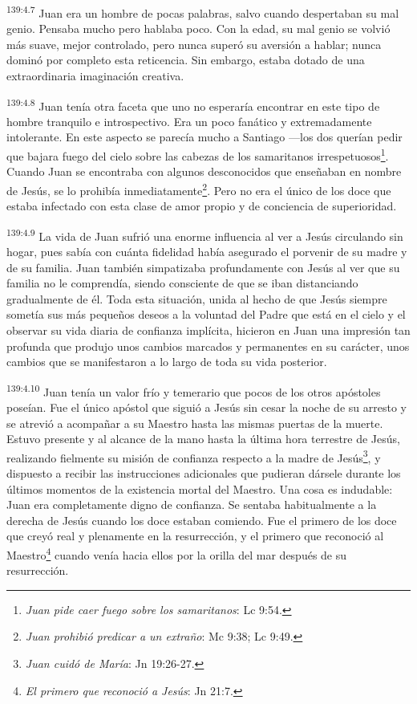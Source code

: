 \par
\textsuperscript{139:4.7} Juan era un hombre de pocas palabras, salvo cuando despertaban su mal genio. Pensaba mucho pero hablaba poco. Con la edad, su mal genio se volvió más suave, mejor controlado, pero nunca superó su aversión a hablar; nunca dominó por completo esta reticencia. Sin embargo, estaba dotado de una extraordinaria imaginación creativa.

\par
\textsuperscript{139:4.8} Juan tenía otra faceta que uno no esperaría encontrar en este tipo de hombre tranquilo e introspectivo. Era un poco fanático y extremadamente intolerante. En este aspecto se parecía mucho a Santiago ---los dos querían pedir que bajara fuego del cielo sobre las cabezas de los samaritanos irrespetuosos\footnote{\textit{Juan pide caer fuego sobre los samaritanos}: Lc 9:54.}. Cuando Juan se encontraba con algunos desconocidos que enseñaban en nombre de Jesús, se lo prohibía inmediatamente\footnote{\textit{Juan prohibió predicar a un extraño}: Mc 9:38; Lc 9:49.}. Pero no era el único de los doce que estaba infectado con esta clase de amor propio y de conciencia de superioridad.

\par
\textsuperscript{139:4.9} La vida de Juan sufrió una enorme influencia al ver a Jesús circulando sin hogar, pues sabía con cuánta fidelidad había asegurado el porvenir de su madre y de su familia. Juan también simpatizaba profundamente con Jesús al ver que su familia no le comprendía, siendo consciente de que se iban distanciando gradualmente de él. Toda esta situación, unida al hecho de que Jesús siempre sometía sus más pequeños deseos a la voluntad del Padre que está en el cielo y el observar su vida diaria de confianza implícita, hicieron en Juan una impresión tan profunda que produjo unos cambios marcados y permanentes en su carácter, unos cambios que se manifestaron a lo largo de toda su vida posterior.

\par
\textsuperscript{139:4.10} Juan tenía un valor frío y temerario que pocos de los otros apóstoles poseían. Fue el único apóstol que siguió a Jesús sin cesar la noche de su arresto y se atrevió a acompañar a su Maestro hasta las mismas puertas de la muerte. Estuvo presente y al alcance de la mano hasta la última hora terrestre de Jesús, realizando fielmente su misión de confianza respecto a la madre de Jesús\footnote{\textit{Juan cuidó de María}: Jn 19:26-27.}, y dispuesto a recibir las instrucciones adicionales que pudieran dársele durante los últimos momentos de la existencia mortal del Maestro. Una cosa es indudable: Juan era completamente digno de confianza. Se sentaba habitualmente a la derecha de Jesús cuando los doce estaban comiendo. Fue el primero de los doce que creyó real y plenamente en la resurrección, y el primero que reconoció al Maestro\footnote{\textit{El primero que reconoció a Jesús}: Jn 21:7.} cuando venía hacia ellos por la orilla del mar después de su resurrección.

